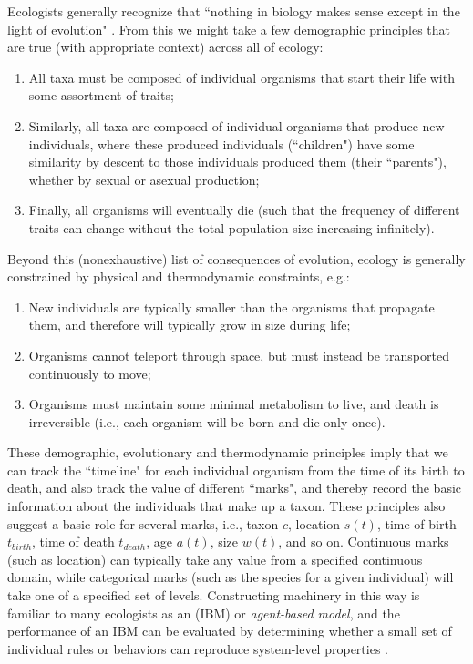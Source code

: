 Ecologists generally recognize that ``nothing in biology makes sense except in the light of evolution" \cite{dobzhansky_genetics_1982,dobzhansky_nothing_1973}. From this we might take a few demographic principles that are true (with appropriate context) across all of ecology:
\begin{enumerate}
  \item All taxa must be composed of individual organisms that start their life with some assortment of traits;

  \item Similarly, all taxa are composed of individual organisms that produce new individuals, where these produced individuals (``children") have some similarity by descent to those individuals produced them (their ``parents"), whether by sexual or asexual production;

  \item Finally, all organisms will eventually die (such that the frequency of different traits can change without the total population size increasing infinitely).
\end{enumerate}
Beyond this (nonexhaustive) list of consequences of evolution, ecology is generally constrained by physical and thermodynamic constraints, e.g.:
\begin{enumerate}
  \item New individuals are typically smaller than the organisms that propagate them, and therefore will typically grow in size during life;

  \item Organisms cannot teleport through space, but must instead be transported continuously to move;

  \item Organisms must maintain some minimal metabolism to live, and death is irreversible (i.e., each organism will be born and die only once).
\end{enumerate}  
These demographic, evolutionary and thermodynamic principles imply that we can track the ``timeline" for each individual organism from the time of its birth to death, and also track the value of different ``marks", and thereby record the basic information about the individuals that make up a taxon. These principles also suggest a basic role for several marks, i.e., taxon \(c\), location \( s(t) \), time of birth \(t_{birth}\), time of death \(t_{death}\), age \( a(t) \), size \( w(t) \), and so on.  Continuous marks (such as location) can typically take any value from a specified continuous domain, while categorical marks (such as the species for a given individual) will take one of a specified set of levels.  Constructing machinery in this way is familiar to many ecologists as an  (IBM) or \textit{agent-based model}, and the performance of an IBM can be evaluated by determining whether a small set of individual rules or behaviors can reproduce system-level properties \cite{grimm_individual-based_2005}.   

